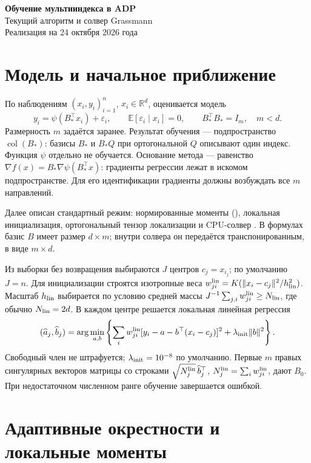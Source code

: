 \documentclass[11pt,a4paper]{article}
\newcommand{\R}{\mathbb R}
\newcommand{\norm}[1]{\lVert#1\rVert}
\newcommand{\code}[1]{\texttt{\detokenize{#1}}}
\begin{document}
\begin{center}
{\Large\bfseries Обучение мультииндекса в ADP}\\[3pt]
{\large Текущий алгоритм и солвер Grassmann}\\[5pt]
{\small Реализация на 24 октября 2026 года}
\end{center}

\section{Модель и начальное приближение}

По наблюдениям $(x_i,y_i)_{i=1}^n$, $x_i\in\R^d$, оценивается модель
\[
 y_i=\psi(B_*^\top x_i)+\varepsilon_i,
 \qquad \mathbb E[\varepsilon_i\mid x_i]=0,
 \qquad B_*^\top B_*=I_m,\quad m<d.
\]
Размерность $m$ задаётся заранее. Результат обучения --- подпространство
$\operatorname{col}(B_*)$: базисы $B_*$ и $B_*Q$ при ортогональной $Q$
описывают один индекс. Функция $\psi$ отдельно не обучается.
Основание метода --- равенство
$\nabla f(x)=B_*\nabla\psi(B_*^\top x)$: градиенты регрессии лежат
в искомом подпространстве. Для его идентификации градиенты должны
возбуждать все $m$ направлений.

Далее описан стандартный режим: нормированные моменты
(\code{estimator="new"}), локальная инициализация, ортогональный тензор
локализации и CPU-солвер \code{grassman}.
В формулах базис $B$ имеет размер $d\times m$; внутри солвера он передаётся
транспонированным, в виде $m\times d$.

Из выборки без возвращения выбираются $J$ центров $c_j=x_{i_j}$;
по умолчанию $J=n$. Для инициализации строятся изотропные веса
$w^{\rm lin}_{ji}=K(\norm{x_i-c_j}^2/h_{\rm lin}^2)$.
Масштаб $h_{\rm lin}$ выбирается по условию средней массы
$J^{-1}\sum_{j,i}w^{\rm lin}_{ji}\ge N_{\rm lin}$, где обычно
$N_{\rm lin}=2d$. В каждом центре решается локальная линейная регрессия
\[
 (\widehat a_j,\widehat b_j)
 =\arg\min_{a,b}\left\{
 \sum_iw^{\rm lin}_{ji}[y_i-a-b^\top(x_i-c_j)]^2
 +\lambda_{\rm init}\norm{b}^2\right\}.
\]
Свободный член не штрафуется; $\lambda_{\rm init}=10^{-8}$ по умолчанию.
Первые $m$ правых сингулярных векторов матрицы со строками
$\sqrt{N_j^{\rm lin}}\,\widehat b_j^\top$,
$N_j^{\rm lin}=\sum_iw^{\rm lin}_{ji}$, дают $B_0$.
При недостаточном численном ранге обучение завершается ошибкой.

\section{Адаптивные окрестности и локальные моменты}
\end{document}
